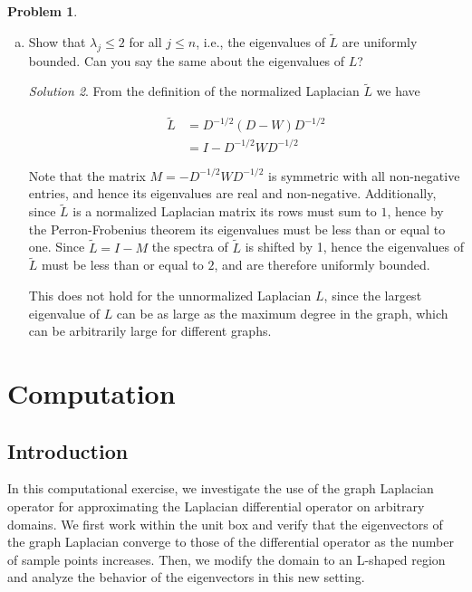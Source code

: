 \documentclass[12pt,a4paper]{article}
\theoremstyle{definition}
\newtheorem{problem}{Problem}
\theoremstyle{remark}
\newtheorem*{solution}{Solution}
\begin{document}
\begin{problem}
\begin{enumerate}[(a)]
\begin{solution}
            $$\mathbf v = D^{1/2} \left(\sum_{j=1}^M \alpha_j \boldsymbol 1_{G_j} \right) = \sum_{j=1}^M \alpha_j D^{1/2}\boldsymbol 1_{G_j}$$

            Since $D^{1/2}$ is an invertible matrix the set $\{D^{1/2} I_{G_j}\}_{j=1}^M$ is linearly independent, therefore the null space of $\tilde L$ must be $M$ dimensional and spanned by the weighted set functions $D^{1/2} \boldsymbol 1_{G_j}$. 
        \end{solution}

        \item Show that $\lambda_j \le 2$ for all $j \le n$, i.e., the eigenvalues of $\tilde L$ are uniformly bounded. Can you say the same about the eigenvalues of $L$? 
        \begin{solution}
            From the definition of the normalized Laplacian $\tilde L$ we have 

            \begin{align*}
                \tilde L &= D^{-1/2} (D-W) D^{-1/2}  \\
                &= I - D^{-1/2} W D^{-1/2}
            \end{align*}

            Note that the matrix $M=-D^{-1/2} W D^{-1/2}$ is symmetric with all non-negative entries, and hence its eigenvalues are real and non-negative. Additionally, since $\tilde L$ is a normalized Laplacian matrix its rows must sum to $1$, hence by the Perron-Frobenius theorem its eigenvalues must be less than or equal to one. Since $\tilde L = I - M$ the spectra of $\tilde L$ is shifted by 1, hence the eigenvalues of $\tilde L$ must be less than or equal to $2$, and are therefore uniformly bounded.

            This does not hold for the unnormalized Laplacian $L$, since the largest eigenvalue of $L$ can be as large as the maximum degree in the graph, which can be arbitrarily large for different graphs.
        \end{solution}
    \end{enumerate}
\end{problem}

\section{Computation}

\subsection{Introduction}
In this computational exercise, we investigate the use of the graph Laplacian operator for approximating the Laplacian differential operator on arbitrary domains. We first work within the unit box and verify that the eigenvectors of the graph Laplacian converge to those of the differential operator as the number of sample points increases. Then, we modify the domain to an L-shaped region and analyze the behavior of the eigenvectors in this new setting.
\end{document}
